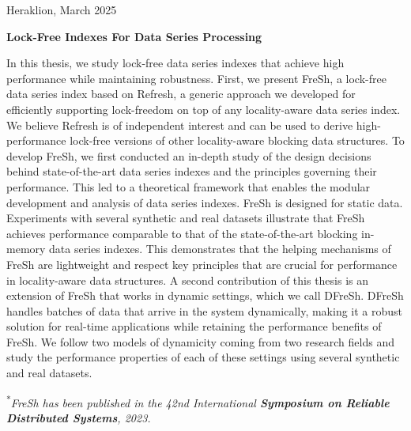 \documentclass[a4paper,11pt,twoside,openany]{book}
\newcommand{\thesisdate}{March 2025 }
\begin{document}
\begin{titlepage}
\begin{center}
\vfill Heraklion, \thesisdate{}
\end{center}

\thispagestyle{empty}

\end{titlepage}

\cleardoublepage








\thispagestyle{empty}
\begin{titlepage}
\begin{center}
\bc \Large{ \textbf{Lock-Free Indexes For Data Series Processing}} \ec {}\\\ec
\end{center}

In this thesis, we study lock-free data series indexes that achieve high performance
while maintaining robustness. First, we present FreSh, a lock-free data series index
based on Refresh, a generic approach we developed for efficiently supporting
lock-freedom on top of any locality-aware data series index.
We believe Refresh is of independent interest and can be used to derive 
high-performance lock-free versions of other locality-aware blocking data structures.
% 
To develop FreSh, we first conducted an in-depth study of the design decisions 
behind state-of-the-art data series indexes and the principles governing their 
performance. This led to a theoretical framework that enables the modular development 
and analysis of data series indexes. FreSh is designed for static data.
Experiments with several synthetic and real datasets illustrate that FreSh 
achieves performance comparable to that of the state-of-the-art blocking 
in-memory data series indexes. This demonstrates that the helping mechanisms of FreSh 
are lightweight and respect key principles that are crucial for performance 
in locality-aware data structures.
% 
A second contribution of this thesis is an extension of FreSh that works
in dynamic settings, which we call DFreSh. DFreSh handles batches of data that arrive
in the system dynamically, making it a robust solution for real-time applications while
retaining the performance benefits of FreSh. We follow two models of dynamicity coming
from two research fields and study the performance properties of each of these settings
using several synthetic and real datasets. 




\vspace{1em}
\begin{center}
    \textsuperscript{*}\textit{FreSh has been published in the 42nd International \textbf{Symposium on Reliable Distributed Systems}, 2023.}
\end{center}
\vspace{1em}

\vfill
\end{titlepage}
\end{document}
